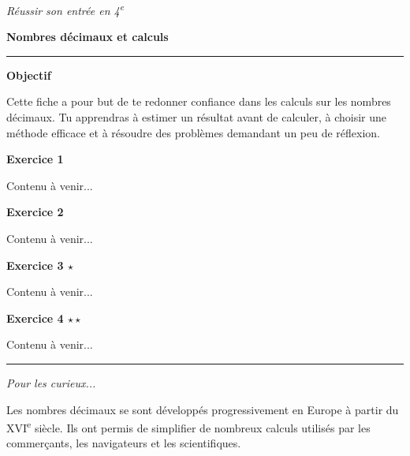 \documentclass[a4paper,11pt]{article}
\begin{document}
{\large\textit{Réussir son entrée en 4\textsuperscript{e}}}

\vspace{0.3cm}

{\LARGE\bfseries Nombres décimaux et calculs}

\vspace{0.3cm}

\hrule

\vspace{0.6cm}

\textbf{Objectif}

Cette fiche a pour but de te redonner confiance dans les calculs sur les nombres décimaux. Tu apprendras à estimer un résultat avant de calculer, à choisir une méthode efficace et à résoudre des problèmes demandant un peu de réflexion.

\vspace{0.8cm}

\textbf{Exercice 1}

Contenu à venir...

\vspace{0.6cm}

\textbf{Exercice 2}

Contenu à venir...

\vspace{0.6cm}

\textbf{Exercice 3 $\star$}

Contenu à venir...

\vspace{0.6cm}

\textbf{Exercice 4 $\star\star$}

Contenu à venir...

\vfill

\hrule

\smallskip

\textit{Pour les curieux...}

Les nombres décimaux se sont développés progressivement en Europe à partir du XVI\textsuperscript{e} siècle. Ils ont permis de simplifier de nombreux calculs utilisés par les commerçants, les navigateurs et les scientifiques.
\end{document}
